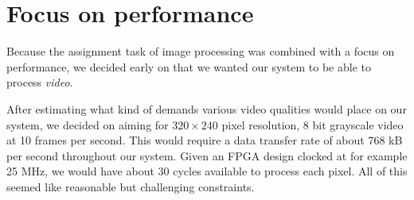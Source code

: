 \section{Focus on performance}

Because the assignment task of image processing was combined with a
focus on performance, we decided early on that we wanted our system to
be able to process \emph{video}.

After estimating what kind of demands various video qualities would
place on our system, we decided on aiming for $320\times240$ pixel
resolution, 8 bit grayscale video at 10 frames per second. This would
require a data transfer rate of about 768 kB per second throughout our
system. Given an FPGA design clocked at for example 25 MHz, we would
have about 30 cycles available to process each pixel. All of this seemed
like reasonable but challenging constraints.
